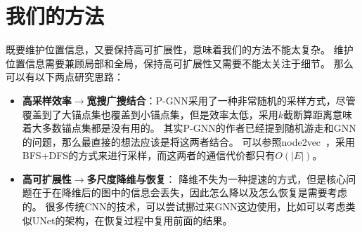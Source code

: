 \documentclass[reportComp]{thesis}
\begin{document}
\section{我们的方法}
既要维护位置信息，又要保持高可扩展性，意味着我们的方法不能太复杂。
维护位置信息需要兼顾局部和全局，保持高可扩展性又需要不能太关注于细节。
那么可以有以下两点研究思路：
\begin{itemize}
\item \textbf{高采样效率$\to$宽搜广搜结合}：P-GNN采用了一种非常随机的采样方式，尽管覆盖到了大锚点集也覆盖到小锚点集，但是效率太低，采用$k$截断算距离意味着大多数锚点集都是没有用的。
其实P-GNN的作者已经提到随机游走和GNN的问题，那么最直接的想法应该是将这两者结合。
可以参照node2vec~\cite{grover:node2vec_kdd_2016}，采用BFS+DFS的方式来进行采样，而这两者的通信代价都只有$O(|E|)$。
\item \textbf{高可扩展性$\to$多尺度降维与恢复}：
降维不失为一种提速的方式，但是核心问题在于在降维后的图中的信息会丢失，因此怎么降以及怎么恢复是需要考虑的。
很多传统CNN的技术，可以尝试挪过来GNN这边使用，比如可以考虑类似UNet的架构，在恢复过程中复用前面的结果。
\end{itemize}



\end{document}
